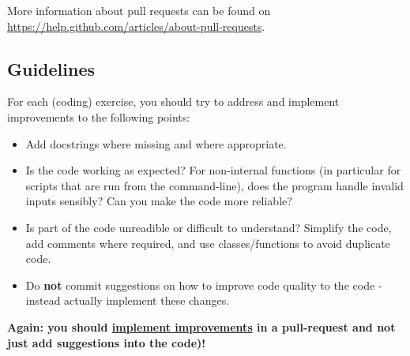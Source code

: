 \documentclass[a4paper]{article}
\begin{document}
More information about pull requests can be found on \url{https://help.github.com/articles/about-pull-requests}.


\subsection{Guidelines}\label{sec:general_review}
For each (coding) exercise, you should try to address and implement improvements to the following points:

\begin{itemize}
  \item Add docstrings where missing and where appropriate.
  \item Is the code working as expected? For non-internal functions (in particular for scripts that are run from the command-line), does the program handle invalid inputs sensibly? Can you make the code more reliable?
  \item Is part of the code unreadible or difficult to understand? Simplify the code, add comments where required, and use classes/functions to avoid duplicate code. 
\item Do \textbf{not} commit suggestions on how to improve code quality to the code - instead actually implement these changes. 
\end{itemize}

\textbf{Again:  you should \underline{implement improvements} in a pull-request and not just add suggestions into the code)!}


\end{document}
